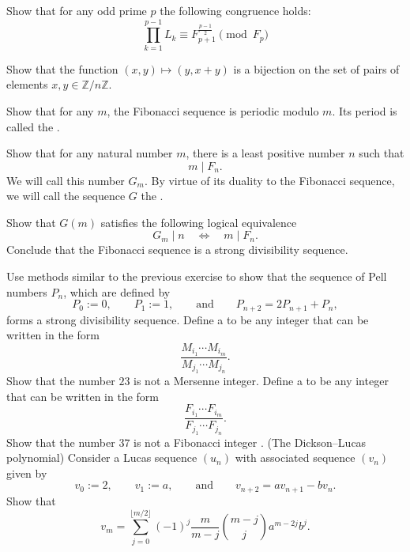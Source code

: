 \begin{challenge}
  \exercise Show that for any odd prime $p$ the following congruence holds:
  \begin{equation*}
    \prod_{k=1}^{p-1}L_k\equiv F_{p+1}^{\frac{p-1}{2}}\pmod{F_p}
  \end{equation*}
  \exercise \label{exercise:pisano-period}
  \begin{subexenum}
  \item Show that the function $(x,y)\mapsto (y,x+y)$ is a bijection on the set of pairs of elements $x,y\in \mathbb{Z}/n\mathbb{Z}$.
  \item Show that for any $m$, the Fibonacci sequence is periodic modulo $m$. Its period is called the .
  \item Show that for any natural number $m$, there is a least positive number $n$ such that
    \begin{equation*}
      m\mid F_n.
    \end{equation*}
    We will call this number $G_m$. By virtue of its duality to the Fibonacci sequence, we will call the sequence $G$ the .
  \item Show that $G(m)$ satisfies the following logical equivalence
    \begin{equation*}
      G_m\mid n \quad\Leftrightarrow\quad m \mid F_n.
    \end{equation*}
    Conclude that the Fibonacci sequence is a strong divisibility sequence.
  \end{subexenum}
  \exercise Use methods similar to the previous exercise to show that the sequence of Pell numbers $P_n$, which are defined by
  \begin{equation*}
    P_0:=0,\qquad P_1:=1,\qquad\text{and}\qquad P_{n+2}=2P_{n+1}+P_{n},
  \end{equation*}
  forms a strong divisibility sequence.
  \exercise Define a  to be any integer that can be written in the form
  \begin{equation*}
    \frac{M_{i_1}\cdots M_{i_m}}{M_{j_1}\cdots M_{j_n}}.
  \end{equation*}
  Show that the number $23$ is not a Mersenne integer.
  \exercise Define a  to be any integer that can be written in the form
  \begin{equation*}
    \frac{F_{i_1}\cdots F_{i_m}}{F_{j_1}\cdots F_{j_n}}.
  \end{equation*}
  Show that the number $37$ is not a Fibonacci integer \cite{luca2003}.
  \exercise (The Dickson--Lucas polynomial) Consider a Lucas sequence $(u_n)$ with associated sequence $(v_n)$ given by
  \begin{equation*}
    v_0 := 2, \qquad v_1 := a,\qquad\text{and}\qquad v_{n+2}=av_{n+1}-bv_n.
  \end{equation*}
  Show that
  \begin{equation*}
    v_m = \sum_{j=0}^{\lfloor m/2 \rfloor} (-1)^j\frac{m}{m-j}\binom{m-j}{j} a^{m-2j}b^j.
  \end{equation*}
\end{challenge}


